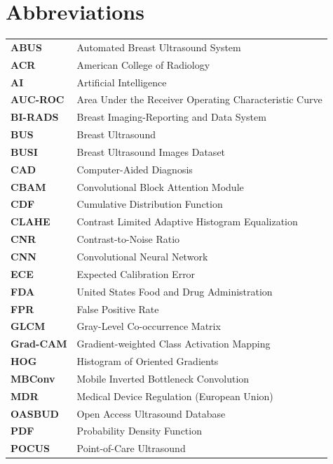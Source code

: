 \chapter*{Abbreviations}

\begin{table}[htbp]
\begin{tabular}{@{}ll@{}}
\textbf{ABUS} & Automated Breast Ultrasound System \\
\textbf{ACR} & American College of Radiology \\
\textbf{AI} & Artificial Intelligence \\
\textbf{AUC-ROC} & Area Under the Receiver Operating Characteristic Curve \\
\textbf{BI-RADS} & Breast Imaging-Reporting and Data System \\
\textbf{BUS} & Breast Ultrasound \\
\textbf{BUSI} & Breast Ultrasound Images Dataset \\
\textbf{CAD} & Computer-Aided Diagnosis \\
\textbf{CBAM} & Convolutional Block Attention Module \\
\textbf{CDF} & Cumulative Distribution Function \\
\textbf{CLAHE} & Contrast Limited Adaptive Histogram Equalization \\
\textbf{CNR} & Contrast-to-Noise Ratio \\
\textbf{CNN} & Convolutional Neural Network \\
\textbf{ECE} & Expected Calibration Error \\
\textbf{FDA} & United States Food and Drug Administration \\
\textbf{FPR} & False Positive Rate \\
\textbf{GLCM} & Gray-Level Co-occurrence Matrix \\
\textbf{Grad-CAM} & Gradient-weighted Class Activation Mapping \\
\textbf{HOG} & Histogram of Oriented Gradients \\
\textbf{MBConv} & Mobile Inverted Bottleneck Convolution \\
\textbf{MDR} & Medical Device Regulation (European Union) \\
\textbf{OASBUD} & Open Access Ultrasound Database \\
\textbf{PDF} & Probability Density Function \\
\textbf{POCUS} & Point-of-Care Ultrasound \\

\end{tabular}
\end{table}
